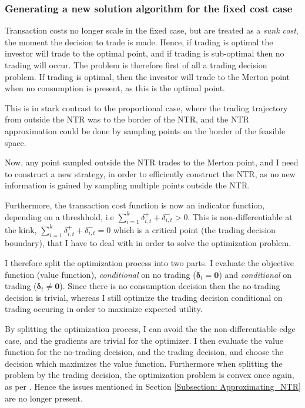 \documentclass[11pt]{article}
\begin{document}
\subsubsection{Generating a new solution algorithm for the fixed cost case} \label{Subsubsection: FixedCostSolution}
Transaction costs no longer scale in the fixed case, but are treated as a \textit{sunk cost}, 
the moment the decision to trade is made. 
Hence, if trading is optimal the investor will trade to the optimal point,
and if trading is sub-optimal then no trading will occur. 
The problem is therefore first of all a trading decision problem. If trading is optimal, then the investor will trade to the Merton point when no consumption is present, as this is the optimal point.

This is in stark contrast to the proportional case, where the trading trajectory from outside the \ac{NTR} was to the border of the \ac{NTR}, and the \ac{NTR} approximation could be done by sampling points on the border of the feasible space.

Now, any point sampled outside the \ac{NTR} trades to the Merton point, and I need to construct a new strategy, 
in order to efficiently construct the \ac{NTR}, as no new information is
gained by sampling multiple points outside the \ac{NTR}.

Furthermore, the transaction cost function is now an indicator function, depending on a threshhold, i.e $\sum^{k}_{i=1} \delta^{+}_{i,t} + \delta^{-}_{i,t}  > 0$.
This is non-differentiable at the kink, $\sum^{k}_{i=1} \delta^{+}_{i,t} + \delta^{-}_{i,t} =0$ 
which is a critical point (the trading decision boundary), that I have to deal with in order to solve the optimization problem.

I therefore split the optimization process into two parts. I evaluate the objective function (value function), \textit{conditional} on no trading ($\boldsymbol{\delta}_{t} = \mathbf{0}$) and \textit{conditional} on trading ($\boldsymbol{\delta}_{t} \neq \mathbf{0}$).
Since there is no consumption decision then the no-trading decision is trivial,
whereas I still optimize the trading decision conditional on trading occuring in order to maximize expected utility. 

By splitting the optimization process, I can avoid the the non-differentiable edge case, and the gradients are trivial for the optimizer.
I then evaluate the value function for the no-trading decision, and the trading decision, and choose the decision which maximizes the value function.
Furthermore when splitting the problem by the trading decision, the optimization problem is convex once again, as per \autocite{Dybvig2020}.
Hence the issues mentioned in Section \ref{Subsection: Approximating_NTR} are no longer present.
\end{document}

